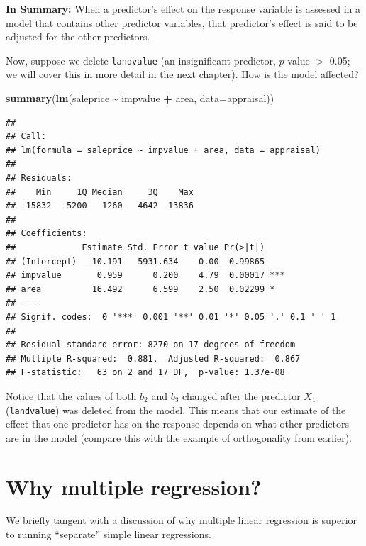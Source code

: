 \documentclass[
]{book}
\newenvironment{Shaded}{\begin{snugshade}}{\end{snugshade}}
\newcommand{\AttributeTok}[1]{\textcolor[rgb]{0.13,0.29,0.53}{#1}}
\newcommand{\FunctionTok}[1]{\textcolor[rgb]{0.13,0.29,0.53}{\textbf{#1}}}
\newcommand{\NormalTok}[1]{#1}
\newcommand{\SpecialCharTok}[1]{\textcolor[rgb]{0.81,0.36,0.00}{\textbf{#1}}}
\begin{document}
\textbf{In Summary:} When a predictor's effect on the response variable is assessed in a model that contains other predictor variables, that predictor's effect is said to be adjusted for the other predictors.

Now, suppose we delete \texttt{landvalue} (an insignificant predictor, \(p\)-value \(>\) 0.05; we will cover this in more detail in the next chapter). How is the model affected?

\begin{Shaded}
\begin{Highlighting}[]
\FunctionTok{summary}\NormalTok{(}\FunctionTok{lm}\NormalTok{(saleprice }\SpecialCharTok{\textasciitilde{}}\NormalTok{ impvalue }\SpecialCharTok{+}\NormalTok{ area, }\AttributeTok{data=}\NormalTok{appraisal))}
\end{Highlighting}
\end{Shaded}

\begin{verbatim}
## 
## Call:
## lm(formula = saleprice ~ impvalue + area, data = appraisal)
## 
## Residuals:
##    Min     1Q Median     3Q    Max 
## -15832  -5200   1260   4642  13836 
## 
## Coefficients:
##             Estimate Std. Error t value Pr(>|t|)    
## (Intercept)  -10.191   5931.634    0.00  0.99865    
## impvalue       0.959      0.200    4.79  0.00017 ***
## area          16.492      6.599    2.50  0.02299 *  
## ---
## Signif. codes:  0 '***' 0.001 '**' 0.01 '*' 0.05 '.' 0.1 ' ' 1
## 
## Residual standard error: 8270 on 17 degrees of freedom
## Multiple R-squared:  0.881,  Adjusted R-squared:  0.867 
## F-statistic:   63 on 2 and 17 DF,  p-value: 1.37e-08
\end{verbatim}

Notice that the values of both \(b_2\) and \(b_3\) changed after the predictor \(X_1\) (\texttt{landvalue}) was deleted from the model.
This means that our estimate of the effect that one predictor has on the response depends on what other predictors are in the model (compare this with the example of orthogonality from earlier).

\hypertarget{whymultiple}{%
\section{Why multiple regression?}\label{whymultiple}}

We briefly tangent with a discussion of why multiple linear regression is superior to running ``separate'' simple linear regressions.
\end{document}
